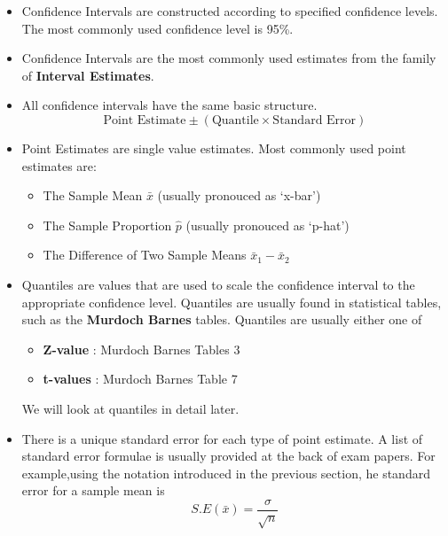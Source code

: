 \begin{itemize}
\item Confidence Intervals are constructed according to specified confidence levels. The most commonly used confidence level is 95\%.
\item Confidence Intervals are the most commonly used estimates from the family of \textbf{Interval Estimates}.
\item All confidence intervals have the same basic structure.
\[\mbox{Point Estimate} \pm \left( \mbox{Quantile} \times \mbox{Standard Error} \right)\]
\item Point Estimates are single value estimates. Most commonly used point estimates are:
\begin{itemize}
\item The Sample Mean $\bar{x}$ (usually pronouced as `x-bar')
\item The Sample Proportion $\hat{p}$ (usually pronouced as `p-hat')
\item The Difference of Two Sample Means $\bar{x}_1 - \bar{x}_2 $
\end{itemize}
\item Quantiles are values that are used to scale the confidence interval to the appropriate confidence level. Quantiles are usually found in statistical tables, such as the \textbf{Murdoch Barnes} tables. Quantiles are usually either one of
\begin{itemize}
\item \textbf{Z-value} : Murdoch Barnes Tables 3 
\item \textbf{t-values} : Murdoch Barnes Table 7
\end{itemize}
 We will look at quantiles in detail later.
\item There is a unique standard error for each type of point estimate. A list of standard error formulae is usually provided at the back of exam papers. For example,using the notation introduced in the previous section, he standard error for a sample mean is 
\[ S.E (\bar{x}) =  \frac{\sigma}{\sqrt{n}}\]


\end{itemize}

          
